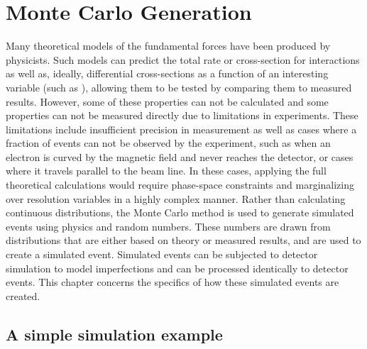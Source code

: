 \chapter{Monte Carlo Generation}
\label{Chapt:simulation_chapter}
Many theoretical models of the fundamental forces have been produced by physicists. Such models can predict the total rate or cross-section for interactions as well as, ideally, differential cross-sections as a  function of an interesting variable (such as \phistar), allowing them to be tested by comparing them to measured results.  However, some of these properties can not be calculated and some properties can not be measured directly due to limitations in experiments. These limitations include insufficient precision in measurement as well as cases where a fraction of events can not be observed by the experiment, such as when an electron is curved by the magnetic field and never reaches the detector, or cases where it travels parallel to the beam line. In these cases, applying the full theoretical calculations would require phase-space constraints and marginalizing over resolution variables in a highly complex manner.  Rather than calculating continuous distributions, the Monte Carlo method is used to generate simulated events using physics and random numbers. These numbers are drawn from distributions that are either based on theory or measured results, and are used to create a simulated event.  Simulated events can be subjected to detector simulation to model imperfections and can be processed identically to detector events. This chapter concerns the specifics of how these simulated events are created.
\section{A simple simulation example}


